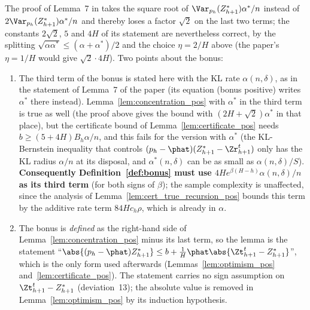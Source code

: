 \begin{remark}\label{rem:pos_constants_bonus}
The proof of Lemma~7 in \cite{essakine2026tight} takes the square root of
$\Var_{p_h}(Z^*_{h+1})\alpha^*/n$ instead of $2\Var_{p_h}(Z^*_{h+1})\alpha^*/n$ and thereby
loses a factor $\sqrt2$ on the last two terms; the constants $2\sqrt2$, $5$ and $4H$ of its
statement are nevertheless correct, by the splitting $\sqrt{\alpha\alpha^*} \le (\alpha + \alpha^*)/2$
and the choice $\eta = 2/H$ above (the paper's $\eta = 1/H$ would give $\sqrt2 \cdot 4H$).
Two points about the bonus:
\begin{enumerate}
  \item[(i)] The third term of the bonus is stated here with the KL rate $\alpha(n,\delta)$,
        as in the statement of Lemma~7 of the paper (its equation (bonus positive) writes
        $\alpha^*$ there instead). Lemma~\ref{lem:concentration_pos} with $\alpha^*$ in the
        third term is true as well (the proof above gives the bound with $(2H + \sqrt2)\alpha^*$ in
        that place), but the certificate bound of Lemma~\ref{lem:certificate_pos} needs
        $b \ge (5 + 4H) B_h \alpha/n$, and this fails for the version with $\alpha^*$ (the
        KL-Bernstein inequality that controls $(p_h - \phat)(Z^*_{h+1} - \Zr^t_{h+1})$ only has the
        KL radius $\alpha/n$ at its disposal, and $\alpha^*(n,\delta)$ can be as small as
        $\alpha(n,\delta)/S$). \textbf{Consequently Definition~\ref{def:bonus} must use
        $4 H e^{\beta(H-h)}\alpha(n,\delta)/n$ as its third term} (for both signs of $\beta$);
        the sample complexity is unaffected, since the analysis of
        Lemma~\ref{lem:cert_true_recursion_pos} bounds this term by the additive rate term
        $84 H c_h \rho$, which is already in $\alpha$.
  \item[(ii)] The bonus is \emph{defined} as the right-hand side of
        Lemma~\ref{lem:concentration_pos} minus its last term, so the lemma is the statement
        ``$\abs{(p_h - \phat)Z^*_{h+1}} \le b + \frac1H\phat\abs{\Zt^t_{h+1} - Z^*_{h+1}}$'', which is
        the only form used afterwards (Lemmas~\ref{lem:optimism_pos} and~\ref{lem:certificate_pos}).
        The statement carries no sign assumption on $\Zt^t_{h+1} - Z^*_{h+1}$ (deviation~13);
        the absolute value is removed in Lemma~\ref{lem:optimism_pos} by its induction hypothesis.
\end{enumerate}
\end{remark}

